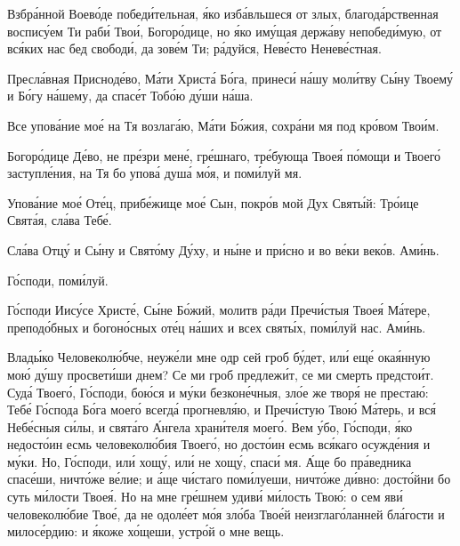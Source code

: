 \begin{mymulticols}

Взбр\'{а}нной Воев\'{о}де побед\'{и}тельная, \'{я}ко изб\'{а}вльшеся от злых, благод\'{а}рственная воспис\'{у}ем Ти раб\'{и} Тво\'{и}, Богор\'{о}дице, но \'{я}ко им\'{у}щая держ\'{а}ву непобед\'{и}мую, от вс\'{я}ких нас бед свобод\'{и}, да зов\'{е}м Ти; р\'{а}дуйся, Нев\'{е}сто Ненев\'{е}стная.

Пресл\'{а}вная Приснод\'{е}во, М\'{а}ти Христ\'{а} Б\'{о}га, принес\'{и} н\'{а}шу мол\'{и}тву С\'{ы}ну Твоем\'{у} и Б\'{о}гу н\'{а}шему, да спас\'{е}т Тоб\'{о}ю д\'{у}ши н\'{а}ша.

Все упов\'{а}ние мо\'{е} на Тя возлаг\'{а}ю, М\'{а}ти Б\'{о}жия, сохр\'{а}ни мя под кр\'{о}вом Тво\'{и}м.

Богор\'{о}дице Д\'{е}во, не пр\'{е}зри мен\'{е}, гр\'{е}шнаго, тр\'{е}бующа Твое\'{я} п\'{о}мощи и Твоег\'{о} заступл\'{е}ния, на Тя бо упов\'{а} душ\'{а} м\'{о}я, и пом\'{и}луй мя.


Упов\'{а}ние мо\'{е} От\'{е}ц, приб\'{е}жище мо\'{е} Сын, покр\'{о}в мой Дух Свят\'{ы}й: Тр\'{о}ице Свят\'{а}я, сл\'{а}ва Теб\'{е}.

\Chestneyshuyu

Сл\'{а}ва Отц\'{у} и С\'{ы}ну и Свят\'{о}му Д\'{у}ху, и н\'{ы}не и пр\'{и}сно и во в\'{е}ки век\'{о}в. Ам\'{и}нь.

Г\'{о}споди, пом\'{и}луй. 

Г\'{о}споди Иис\'{у}се Христ\'{е}, С\'{ы}не Б\'{о}жий, молитв р\'{а}ди Преч\'{и}стыя Твое\'{я} М\'{а}тере, препод\'{о}бных и богон\'{о}сных от\'{е}ц н\'{а}ших и всех свят\'{ы}х, пом\'{и}луй нас. Ам\'{и}нь.


Влад\'{ы}ко Человекол\'{ю}бче, неуж\'{е}ли мне одр сей гроб б\'{у}дет, ил\'{и} ещ\'{е} ока\'{я}нную мо\'{ю} д\'{у}шу просвет\'{и}ши днем? Се ми гроб предлеж\'{и}т, се ми смерть предсто\'{и}т. Суд\'{а} Твоег\'{о}, Г\'{о}споди, бо\'{ю}ся и м\'{у}ки безкон\'{е}чныя, зл\'{о}е же твор\'{я} не преста\'{ю}: Теб\'{е} Г\'{о}спода Б\'{о}га моег\'{о} всегд\'{а} прогневл\'{я}ю, и Преч\'{и}стую Тво\'{ю} М\'{а}терь, и вс\'{я} Неб\'{е}сныя с\'{и}лы, и свят\'{а}го \'{А}нгела хран\'{и}теля моег\'{о}. Вем \'{у}бо, Г\'{о}споди, \'{я}ко недост\'{о}ин есмь человекол\'{ю}бия Твоег\'{о}, но дост\'{о}ин есмь вс\'{я}каго осужд\'{е}ния и м\'{у}ки. Но, Г\'{о}споди, ил\'{и} хощ\'{у}, ил\'{и} не хощ\'{у}, спас\'{и} мя. \'{А}ще бо пр\'{а}ведника спас\'{е}ши, ничт\'{о}же в\'{е}лие; и \'{а}ще ч\'{и}стаго пом\'{и}луеши, ничт\'{о}же д\'{и}вно: дост\'{о}йни бо суть м\'{и}лости Твое\'{я}. Но на мне гр\'{е}шнем удив\'{и} м\'{и}лость Тво\'{ю}: о сем яв\'{и} человекол\'{ю}бие Тво\'{е}, да не одол\'{е}ет м\'{о}я зл\'{о}ба Тво\'{е}й неизглаг\'{о}ланней бл\'{а}гости и милос\'{е}рдию: и \'{я}коже х\'{о}щеши, устр\'{о}й о мне вещь.


\end{mymulticols}
